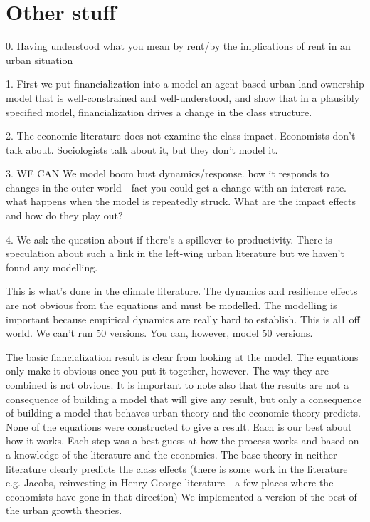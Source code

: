 \section{Other stuff}


0. Having understood what you mean by rent/by the implications of rent in an urban situation

1. First we put financialization into a model an agent-based urban land ownership model that is well-constrained and well-understood, and show that in a plausibly specified model, financialization drives a change in the class structure. 

2. The economic literature does not examine the class impact. Economists don't talk about. Sociologists talk about it, but they don't model it.

3. WE CAN We model boom bust dynamics/response. how it responds to changes in the outer world - fact you could get a change with an interest rate. what happens when the model is repeatedly struck. What are the impact effects and how do they play out?

4.  We ask the question about if there's a spillover to productivity. There is speculation about such a link in the left-wing urban literature but we haven't found any modelling.

This is what's done in the climate literature. The dynamics and resilience effects are not obvious from the equations and must be modelled. The modelling is important because empirical dynamics are really hard to establish. This is al1 off world. We can't run 50 versions. You can, however, model 50 versions. 

The basic fiancialization result is clear from looking at the model. The equations only make it obvious once you put it together, however. The way they are combined is not obvious.  It is important to note also that the results are not a consequence of building a model that will give any result, but only a consequence of building a model that behaves urban theory and the economic theory predicts. None of the equations were constructed to give a result. Each is our best about how it works. Each step was a best guess at how the process works and based on a knowledge of the literature and the economics. The base theory in neither literature clearly predicts the class effects (there is some work in the literature e.g. Jacobs, reinvesting in Henry George literature - a few places where the economists have gone in that direction) We implemented a version of the best of the urban growth theories.

